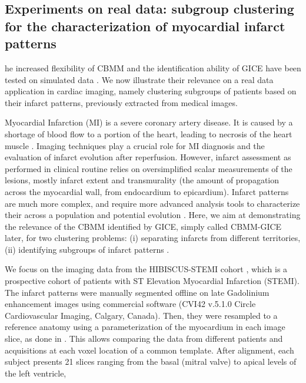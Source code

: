 \subsection{Experiments on real data: subgroup clustering for the characterization of myocardial infarct patterns}
\label{subsec:Application to subgroup clustering for myocardial infarct}

he increased flexibility of CBMM and the identification ability of GICE have been tested on simulated data . We now illustrate their relevance on a real data application in cardiac imaging, namely clustering subgroups of patients based on their infarct patterns, previously extracted from medical images.

Myocardial Infarction (MI) is a severe coronary artery disease. It is caused by a shortage of blood flow to a portion of the heart, leading to necrosis of the heart muscle . Imaging techniques play a crucial role for MI diagnosis and the evaluation of infarct evolution after reperfusion.
However, infarct assessment as performed in clinical routine relies on oversimplified scalar measurements of the lesions, mostly infarct extent and transmurality (the amount of propagation across the myocardial wall, from endocardium to epicardium). Infarct patterns are much more complex, and require more advanced analysis tools to characterize their  across a population and potential evolution \cite{Duchateau:FrontCV:20233}. Here, we aim at demonstrating the relevance of the CBMM identified by GICE, simply called CBMM-GICE later, for two clustering problems: (i) separating infarcts from different territories, (ii) identifying subgroups of infarct patterns . 

We focus on the imaging data from the HIBISCUS-STEMI cohort , %
which is a prospective cohort of patients with ST Elevation Myocardial Infarction (STEMI). The infarct patterns were manually segmented offline on late Gadolinium enhancement  images using commercial software (CVI42 v.5.1.0 Circle Cardiovascular Imaging, Calgary, Canada). Then, they were resampled to a reference anatomy using a parameterization of the myocardium in each image slice, as done in \cite{Duchateau:FrontCV:20233}. This allows comparing the data from different patients and acquisitions at each voxel location of a common template. After alignment, each subject presents 21 slices ranging from the basal (mitral valve) to apical levels of the left ventricle, 

